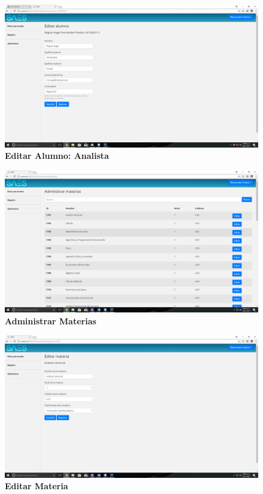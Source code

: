 \begin{figure}[H]
  \centering
    \includegraphics[scale=0.15]{project/images/54.png}
  \caption{\textbf{Editar Alumno: Analista}}
\end{figure}
\begin{figure}[H]
  \centering
    \includegraphics[scale=0.2]{project/images/43.png}
  \caption{\textbf{Administrar Materias}}
\end{figure}
\begin{figure}[H]
  \centering
    \includegraphics[scale=0.2]{project/images/44.png}
  \caption{\textbf{Editar Materia}}
\end{figure}
